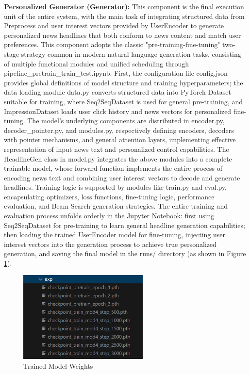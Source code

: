 \documentclass[10pt,a4paper]{article}
\begin{document}
\textbf{Personalized Generator (Generator):}
This component is the final execution unit of the entire system, with the main task of integrating structured data from Preprocess and user interest vectors provided by UserEncoder to generate personalized news headlines that both conform to news content and match user preferences. This component adopts the classic "pre-training-fine-tuning" two-stage strategy common in modern natural language generation tasks, consisting of multiple functional modules and unified scheduling through pipeline\_pretrain\_train\_test.ipynb. First, the configuration file config.json provides global definitions of model structure and training hyperparameters; the data loading module data.py converts structured data into PyTorch Dataset suitable for training, where Seq2SeqDataset is used for general pre-training, and ImpressionDataset loads user click history and news vectors for personalized fine-tuning. The model's underlying components are distributed in encoder.py, decoder\_pointer.py, and modules.py, respectively defining encoders, decoders with pointer mechanisms, and general attention layers, implementing effective representation of input news text and personalized control capabilities. The HeadlineGen class in model.py integrates the above modules into a complete trainable model, whose forward function implements the entire process of encoding news text and combining user interest vectors to decode and generate headlines. Training logic is supported by modules like train.py and eval.py, encapsulating optimizers, loss functions, fine-tuning logic, performance evaluation, and Beam Search generation strategies. The entire training and evaluation process unfolds orderly in the Jupyter Notebook: first using Seq2SeqDataset for pre-training to learn general headline generation capabilities; then loading the trained UserEncoder model for fine-tuning, injecting user interest vectors into the generation process to achieve true personalized generation, and saving the final model in the runs/ directory (as shown in Figure \ref{fig:model_weight}).

\begin{figure}[H]
  \centering
  \includegraphics[width=6.5cm]{fig/model_weight.png}
  \caption{Trained Model Weights}\label{fig:model_weight}
\end{figure}
\end{document}
